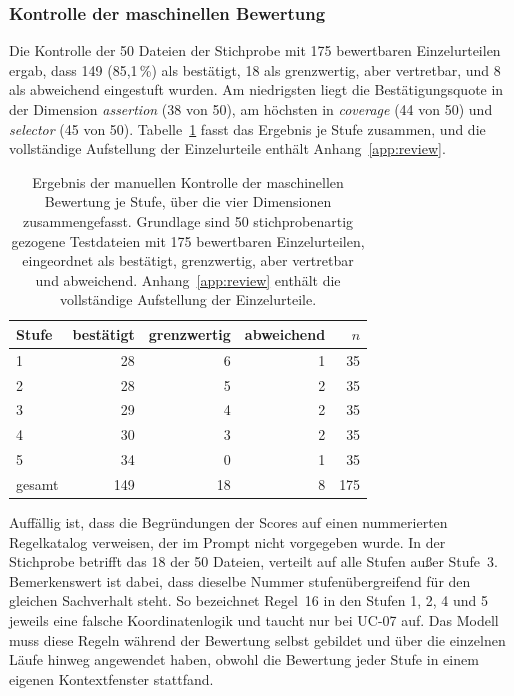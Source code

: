 \subsubsection{Kontrolle der maschinellen Bewertung}

Die Kontrolle der 50 Dateien der Stichprobe mit 175 bewertbaren Einzelurteilen ergab, dass 149 (85,1\,\%) als bestätigt, 18 als grenzwertig, aber vertretbar, und 8 als abweichend eingestuft wurden. Am niedrigsten liegt die Bestätigungsquote in der Dimension \emph{assertion} (38 von 50), am höchsten in \emph{coverage} (44 von 50) und \emph{selector} (45 von 50). Tabelle~\ref{tab:review_by_stage} fasst das Ergebnis je Stufe zusammen, und die vollständige Aufstellung der Einzelurteile enthält Anhang~\ref{app:review}.

\begin{table}[H]
    \centering
    \caption[Ergebnis der Kontrolle je Stufe]{Ergebnis der manuellen Kontrolle der maschinellen Bewertung je Stufe, über die vier Dimensionen zusammengefasst. Grundlage sind 50 stichprobenartig gezogene Testdateien mit 175 bewertbaren Einzelurteilen, eingeordnet als bestätigt, grenzwertig, aber vertretbar und abweichend. Anhang~\ref{app:review} enthält die vollständige Aufstellung der Einzelurteile.}
    \label{tab:review_by_stage}
    \begin{tabular}{lrrrr}
        \toprule
        Stufe & bestätigt & grenzwertig & abweichend & $n$ \\
        \midrule
        1 & 28 & 6 & 1 & 35 \\
        2 & 28 & 5 & 2 & 35 \\
        3 & 29 & 4 & 2 & 35 \\
        4 & 30 & 3 & 2 & 35 \\
        5 & 34 & 0 & 1 & 35 \\
        \midrule
        gesamt & 149 & 18 & 8 & 175 \\
        \bottomrule
    \end{tabular}
\end{table}

Auffällig ist, dass die Begründungen der Scores auf einen nummerierten Regelkatalog verweisen, der im Prompt nicht vorgegeben wurde. In der Stichprobe betrifft das 18 der 50 Dateien, verteilt auf alle Stufen außer Stufe~3. Bemerkenswert ist dabei, dass dieselbe Nummer stufenübergreifend für den gleichen Sachverhalt steht. So bezeichnet Regel~16 in den Stufen 1, 2, 4 und 5 jeweils eine falsche Koordinatenlogik und taucht nur bei UC-07 auf. Das Modell muss diese Regeln während der Bewertung selbst gebildet und über die einzelnen Läufe hinweg angewendet haben, obwohl die Bewertung jeder Stufe in einem eigenen Kontextfenster stattfand.

